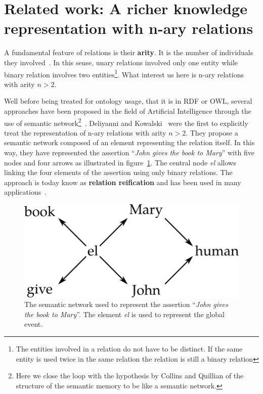 \section[Related work]{Related work: A richer knowledge representation with n-ary relations}

A fundamental feature of relations is their \textbf{arity}. It is the number of individuals they involved~\cite{giunti_2019_representing}. In this sense, unary relations involved only one entity while binary relation involves two entities\footnote{The entities involved in a relation do not have to be distinct. If the same entity is used twice in the same relation the relation is still a binary relation}. What interest us here is n-ary relations with arity $n > 2$.

Well before being treated for ontology usage, that it is in RDF or OWL, several approaches have been proposed in the field of Artificial Intelligence through the use of semantic network\footnote{Here we close the loop with the hypothesis by Collins and Quillian of the structure of the semantic memory to be like a semantic network.}~\cite{brachman_1979_epistemological, sowa_2014_principles}. Deliyanni and Kowalski~\cite{deliyanni_1979_logic} were the first to explicitly treat the representation of n-ary relations with arity $n > 2$. They propose a semantic network composed of an element representing the relation itself. In this way, they have represented the assertion ``\textit{John gives the book to Mary}'' with five nodes and four arrows as illustrated in figure~\ref{fig:chap7_sem_net}. The central node \textit{el} allows linking the four elements of the assertion using only binary relations. The approach is today know as \textbf{relation reification} and has been used in many applications~\cite{gangemi_2008_norms, welty_2006_reusable}.

\begin{figure}[ht!]
\centering
\includegraphics[scale=0.4]{figures/chapter7/semantic_net.png}
\caption{\label{fig:chap7_sem_net} The semantic network used to represent the assertion ``\textit{John gives the book to Mary}''. The element \textit{el} is used to represent the global event.}
\end{figure}

